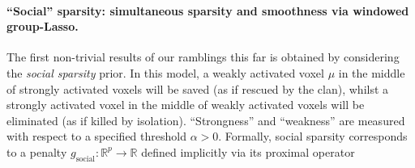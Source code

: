  \paragraph{``Social'' sparsity:  simultaneous sparsity and smoothness via windowed group-Lasso.}
  The first non-trivial results of our ramblings this far is obtained by considering the \textit{social sparsity}  \citep{kowalski2013social,kowalski2009structured} prior. In this model, a weakly activated voxel $\mu$ in the middle of strongly activated voxels will be saved (as if rescued by the clan), whilst a strongly activated voxel in the middle of weakly activated voxels will be eliminated (as if killed by isolation). ``Strongness'' and ``weakness'' are measured with respect to a specified threshold $\alpha > 0$.
Formally, social sparsity corresponds to a penalty  $g_{\text{social}} : \mathbb R^p \rightarrow \mathbb R$ defined implicitly via its proximal operator

